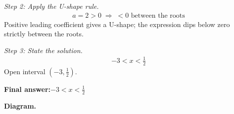 \documentclass[11pt]{article}
\begin{document}
\textit{Step 2: Apply the U-shape rule.}
\[\begin{gathered}
a = 2 > 0 \;\Longrightarrow\; < 0 \text{ between the roots}
\end{gathered}\]
Positive leading coefficient gives a U-shape; the expression dips below zero strictly between the roots.

\textit{Step 3: State the solution.}
\[\begin{gathered}
-3 < x < \tfrac{1}{2}
\end{gathered}\]
Open interval \( (-3, \tfrac{1}{2}) \).

\begin{answerbox}
\textbf{Final answer:}\quad \(\displaystyle -3 < x < \tfrac{1}{2}\)
\end{answerbox}
\textbf{Diagram.}

\begin{center}
\end{center}
\end{document}
